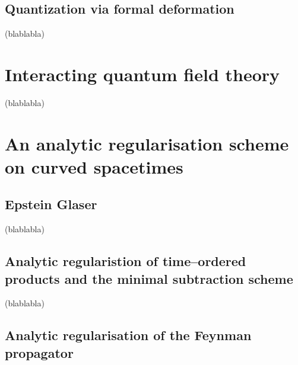 \documentclass[11pt]{book}
\begin{document}
\section{Quantization via formal deformation}


(blablabla)


\chapter{Interacting quantum field theory}

(blablabla)

\chapter{An analytic regularisation scheme on curved spacetimes} \label{chp:reg-sheme}

\section{Epstein Glaser}

(blablabla)

\section{Analytic regularistion of time–ordered products and the minimal subtraction scheme}

(blablabla)

\section{Analytic regularisation of the Feynman propagator}
\end{document}
